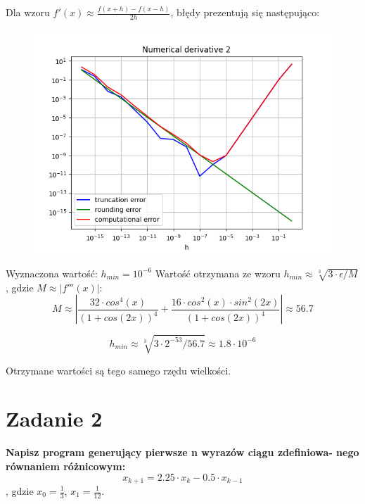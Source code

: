 \documentclass{article}
\begin{document}
Dla wzoru $f'(x)\approx\frac{f(x+h)-f(x-h)}{2h}$, błędy prezentują się następująco:
\begin{figure}[h!]
\includegraphics[width=\linewidth]{figures/numerical_derivative_2.png}
\end{figure}
\newline
Wyznaczona wartość: $h_{min} = 10^{-6}$ \newline
Wartość otrzymana ze wzoru $h_{min} \approx \sqrt[3]{3\cdot\epsilon/M}$,
gdzie $M \approx \left|f'''(x)\right|$: \newline
$$M\approx \left|\frac{32\cdot cos^4(x)}{(1 + cos(2 x))^4} + \frac{16\cdot cos^2(x)\cdot sin^2(2 x)}{(1 + cos(2 x))^4}\right|
\approx 56.7$$

$$h_{min} \approx \sqrt[3]{3\cdot2^{-53}/56.7}
\approx 1.8 \cdot 10^{-6}$$

Otrzymane wartości są tego samego rzędu wielkości.  \newline

\section*{Zadanie 2}
\textbf{Napisz program generujący pierwsze n wyrazów ciągu zdefiniowa-
nego równaniem różnicowym:}
$$x_{k+1} = 2.25\cdot x_k - 0.5\cdot x_{k-1}$$, gdzie $x_0 = \frac{1}{3}$, $ x_1 = \frac{1}{12}$.
\newline\newline
\end{document}
